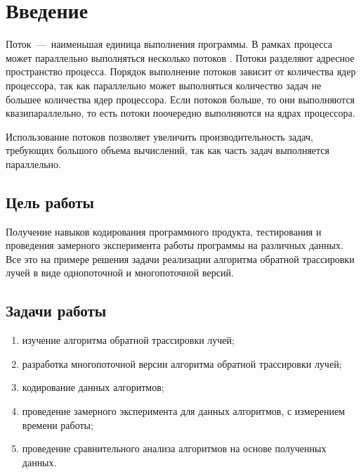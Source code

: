 \setcounter{page}{3}
\chapter*{Введение}

Поток~---~наименьшая единица выполнения программы. В рамках процесса может параллельно выполняться несколько потоков \cite{bib:1}. Потоки разделяют адресное пространство процесса. Порядок выполнение потоков зависит от количества ядер процессора, так как параллельно может выполняться количество задач не большее количества ядер процессора. Если потоков больше, то они выполняются квазипараллельно, то есть потоки поочередно выполняются на ядрах процессора.

Использование потоков позволяет увеличить производительность задач, требующих большого объема вычислений, так как часть задач выполняется параллельно.

\section*{Цель работы}

Получение навыков кодирования программного продукта, тестирования и проведения замерного эксперимента работы программы на различных данных. Все это на примере решения задачи реализации алгоритма обратной трассировки лучей в виде однопоточной и многопоточной версий.

\section*{Задачи работы}

\begin{enumerate}[label={\arabic*)}]
	\item изучение алгоритма обратной трассировки лучей;
	\item разработка многопоточной версии алгоритма обратной трассировки лучей;
	\item кодирование данных алгоритмов;
	\item проведение замерного эксперимента для данных алгоритмов, с измерением времени работы; 
	\item проведение сравнительного анализа алгоритмов на основе полученных данных.
\end{enumerate}

\newpage